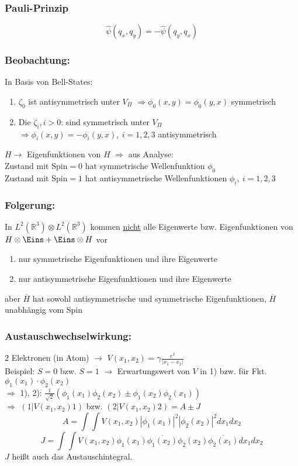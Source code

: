 \documentclass[twoside,a4paper]{scrartcl}
\newcommand{\R}{\mathbb{R}}
\renewcommand{\1}{\mathds{1}}
\newcommand{\Ra}{\Rightarrow}
\newcommand{\ra}{\rightarrow}
\renewcommand{\R}{\mathbb{R}}
\begin{document}
\subsubsection*{Pauli-Prinzip}
$$\hat \psi(q_x,q_y)=- \hat \psi(q_y,q_x)$$
\subsubsection*{Beobachtung:}
In Basis von Bell-States:\\
\begin{enumerate}
\item $\zeta_0$ ist antisymmetrisch unter $V_\Pi$ $\Ra \phi_0(x,y)=\phi_0(y,x)$ symmetrisch
\item Die $\zeta_i, i>0$: sind symmetrisch unter $V_\Pi$ $\Ra \phi_i(x,y)=-\phi_i(y,x), \ i=1,2,3$ antisymmetrisch
\end{enumerate}
$H \ra$ Eigenfunktionen von $H$ $\Ra$ aus Analyse: \\
Zustand mit Spin$=0$ hat symmetrische Wellenfunktion $\phi_0$\\
Zustand mit Spin$=1$ hat antisymmetrische Wellenfunktionen $\phi_i, \ i=1,2,3$\\
\subsubsection*{Folgerung:}
In $L^2(\R^3) \otimes L^2(\R^3)$ kommen \underline{nicht} alle Eigenwerte bzw. Eigenfunktionen von $H \otimes \Eins+\Eins \otimes H$ vor
\begin{enumerate}
\item nur symmetrische Eigenfunktionen und ihre Eigenwerte
\item nur antisymmetrische Eigenfunktionen und ihre Eigenwerte
\end{enumerate}
aber $\overline{H}$ hat sowohl antisymmetrische und symmetrische Eigenfunktionen, $\overline{H}$ unabhängig vom Spin

\subsubsection*{Austauschwechselwirkung:}
2 Elektronen (in Atom) $\ra$ $V(x_1,x_2)=\gamma\frac{e^2}{|x_1-x_2|}$\\
Beispiel: $S=0$ bzw. $S=1$ $\ra$ Erwartungswert von $V$ in 1) bzw. für Fkt. $\phi_1(x_1)\cdot \phi_2(x_2)$\\
$\Ra$ 1), 2): $\frac{1}{\sqrt{2}}(\phi_1(x_1)\phi_2(x_2)\pm\phi_1(x_2)\phi_2(x_1))$\\
$\Ra$ $(1 | V(x_1,x_2) 1)$ bzw. $(2 | V(x_1,x_2) 2)=A\pm J$
$$A=\int \int V(x_1,x_2)|\phi_1(x_1)|^2|\phi_2(x_2)|^2dx_1dx_2$$
$$J=\int \int V(x_1,x_2)\phi_1(x_1)\overline{\phi_1(x_2)}\phi_2(x_2)\overline{\phi_2(x_1)}dx_1dx_2$$
$J$ heißt auch das Austauschintegral.
\end{document}
